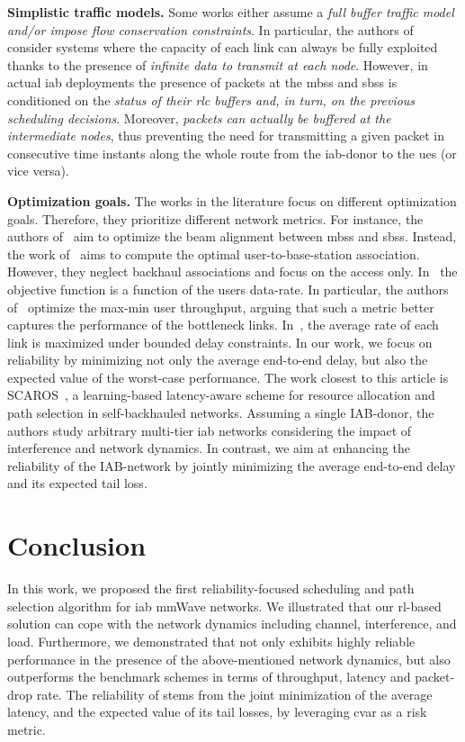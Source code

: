 \textbf{Simplistic traffic models.} Some works either assume a \textit{full buffer traffic model and/or impose flow conservation constraints}. In particular, the authors of~\cite{yuan2018optimal, rasekh2015interference} consider systems where the capacity of each link can  always be fully exploited thanks to the presence of \textit{infinite data to transmit at each node}. However, in actual \gls{iab} deployments the presence of packets at the \glspl{mbs} and \glspl{sbs} is conditioned on the \textit{status of their \gls{rlc} buffers and, in turn, on the previous scheduling decisions}. Moreover, \textit{packets can actually be buffered at the intermediate nodes}, thus preventing the need for transmitting a given packet in consecutive time instants along the whole route from the \gls{iab}-donor to the \glspl{ue} (or vice versa). 

\textbf{Optimization goals.} The works in the literature focus on different optimization goals. Therefore, they prioritize different network metrics. For instance, the authors of~\cite{hur2013millimeter} aim to optimize the beam alignment between \glspl{mbs} and \glspl{sbs}. Instead, the work of~\cite{alizadeh2019load} aims to compute the optimal user-to-base-station association. However, they neglect backhaul associations and focus on the access only. In~\cite{kwon2019joint, alizadeh2019load, zhu2016qos, yuan2018optimal} the objective function is a function of the users data-rate. In particular, the authors of~\cite{yuan2018optimal} optimize the max-min user throughput, arguing that such a metric better captures the performance of the bottleneck links. In~\cite{vu2018path}, the average rate of each link is maximized under bounded delay constraints. In our work, we focus on reliability by minimizing not only the average end-to-end delay, but also the expected value of the worst-case performance.
The work closest to this article is SCAROS~\cite{ortiz2019scaros},  a learning-based latency-aware scheme for resource allocation and path selection in self-backhauled networks. Assuming a single IAB-donor, the authors study arbitrary multi-tier \gls{iab} networks considering the impact of interference and network dynamics. In contrast, we aim at enhancing the reliability of the IAB-network by jointly minimizing the average end-to-end delay and its expected tail loss. 

\section{Conclusion}
\label{s:conclusion}
In this work, we proposed the first reliability-focused scheduling and path selection algorithm for \gls{iab} mmWave networks. We illustrated that our \gls{rl}-based solution can cope with the network dynamics including channel, interference, and load.  Furthermore, we demonstrated that \name{} not only  exhibits highly reliable performance in the presence of the above-mentioned network dynamics, but also outperforms the benchmark schemes in terms of throughput, latency and packet-drop rate. The reliability of \name{} stems from the joint minimization of the average latency, and the expected value of its tail losses, by leveraging \gls{cvar} as a risk metric.

